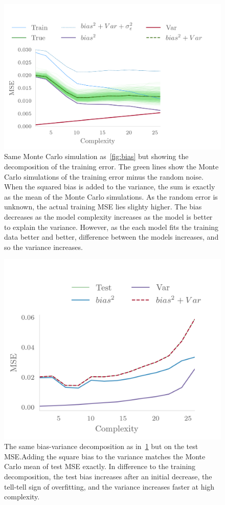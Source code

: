 \begin{figure}[]
  \centering
  \includegraphics[]{figures/trainbiasvariance.png}
  \caption{\label{fig:biastrain} Same Monte Carlo simulation as~\cref{fig:bias}
  but showing the decomposition of the training error. The green lines show the
  Monte Carlo simulations of the training error minus the random noise. When the
squared bias is added to the variance, the sum is exactly as the mean of the
Monte Carlo simulations. As the random error is unknown, the actual training MSE
lies slighty higher. The bias decreases as the model complexity increases as the
model is better to explain the variance. However, as the each model fits the training
data better and better, difference between the models increases, and so the variance increases.}
\end{figure}


\begin{figure}[]
  \centering
  \includegraphics[]{figures/testbiasvariance.png}
  \caption{\label{fig:biastest} The same bias-variance decomposition as
    in~\cref{fig:biastrain} but on the test MSE.\@ Adding the square bias to the
    variance matches the Monte Carlo mean of test MSE exactly. In difference to
    the training decomposition, the test bias increases after an initial
    decrease, the tell-tell sign of overfitting, and the variance increases
    faster at high complexity.}
\end{figure}
